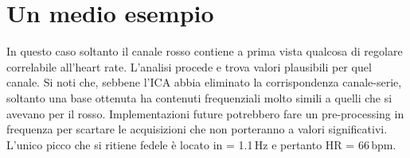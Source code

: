 \section{Un medio esempio}
In questo caso soltanto il canale rosso contiene a prima vista qualcosa di regolare correlabile all'heart rate. L'analisi procede e trova valori plausibili per quel canale. Si noti che, sebbene l'ICA abbia eliminato la corrispondenza canale-serie, soltanto una base ottenuta ha contenuti frequenziali molto simili a quelli che si avevano per il rosso.
Implementazioni future potrebbero fare un pre-processing in frequenza per scartare le acquisizioni che non porteranno a valori significativi.
L'unico picco che si ritiene fedele è locato in  = 1.1\,Hz e pertanto HR = 66\,bpm.
